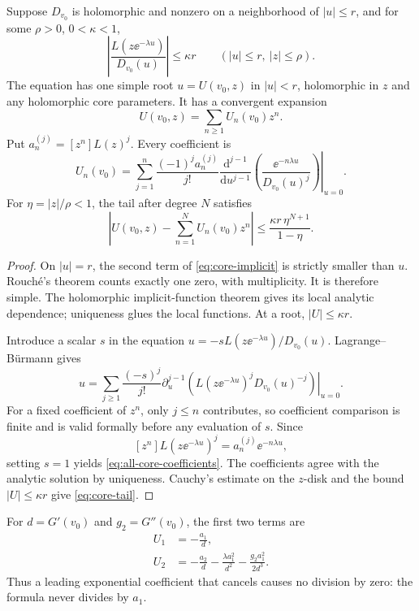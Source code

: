 \begin{theorem}\label{thm:core-inverse}
Suppose \(D_{v_0}\) is holomorphic and nonzero on a neighborhood of
\(|u|\le r\), and for some \(\rho>0\), \(0<\kappa<1\),
\[
 \left|\frac{L(z\ee^{-\lambda u})}{D_{v_0}(u)}\right|
 \le\kappa r
 \qquad (|u|\le r,\ |z|\le\rho).
\]
The equation has one simple root \(u=U(v_0,z)\) in \(|u|<r\),
holomorphic in \(z\) and any holomorphic core parameters.  It has a
convergent expansion
\[
 U(v_0,z)=\sum_{n\ge1}U_n(v_0)z^n.
\]
Put \(a_n^{(j)}=[z^n]L(z)^j\).  Every coefficient is
\begin{equation}\label{eq:all-core-coefficients}
 U_n(v_0)=
 \sum_{j=1}^n\frac{(-1)^j a_n^{(j)}}{j!}
 \left.
 \frac{\mathrm d^{j-1}}{\mathrm du^{j-1}}
 \left(\frac{\ee^{-n\lambda u}}{D_{v_0}(u)^j}\right)
 \right|_{u=0}.
\end{equation}
For \(\eta=|z|/\rho<1\), the tail after degree \(N\) satisfies
\begin{equation}\label{eq:core-tail}
 \left|U(v_0,z)-\sum_{n=1}^NU_n(v_0)z^n\right|
 \le \frac{\kappa r\,\eta^{N+1}}{1-\eta}.
\end{equation}
\end{theorem}
\begin{proof}
On \(|u|=r\), the second term of \cref{eq:core-implicit} is
strictly smaller than \(u\).  Rouch\'e's theorem counts exactly one
zero, with multiplicity.  It is therefore simple.
The holomorphic implicit-function theorem gives its local analytic
dependence; uniqueness glues the local functions.  At a root,
\(|U|\le\kappa r\).

Introduce a scalar \(s\) in the equation
\(u=-sL(z\ee^{-\lambda u})/D_{v_0}(u)\).
Lagrange--B\"urmann gives
\[
 u=\sum_{j\ge1}\frac{(-s)^j}{j!}
 \left.\partial_u^{j-1}
 \left(L(z\ee^{-\lambda u})^jD_{v_0}(u)^{-j}\right)
 \right|_{u=0}.
\]
For a fixed coefficient of \(z^n\), only \(j\le n\) contributes,
so coefficient comparison is finite and is valid formally before
any evaluation of \(s\).  Since
\[
 [z^n]L(z\ee^{-\lambda u})^j
 =a_n^{(j)}\ee^{-n\lambda u},
\]
setting \(s=1\) yields \cref{eq:all-core-coefficients}.
The coefficients agree with the analytic solution by uniqueness.
Cauchy's estimate on the \(z\)-disk and the bound
\(|U|\le\kappa r\) give \cref{eq:core-tail}.
\end{proof}

For \(d=G'(v_0)\) and \(g_2=G''(v_0)\), the first two terms are
\begin{align}
 U_1&=-\frac{a_1}{d},\label{eq:U1}\\
 U_2&=-\frac{a_2}{d}
       -\frac{\lambda a_1^2}{d^2}
       -\frac{g_2a_1^2}{2d^3}.\label{eq:U2}
\end{align}
Thus a leading exponential coefficient that cancels causes no
division by zero: the formula never divides by \(a_1\).

